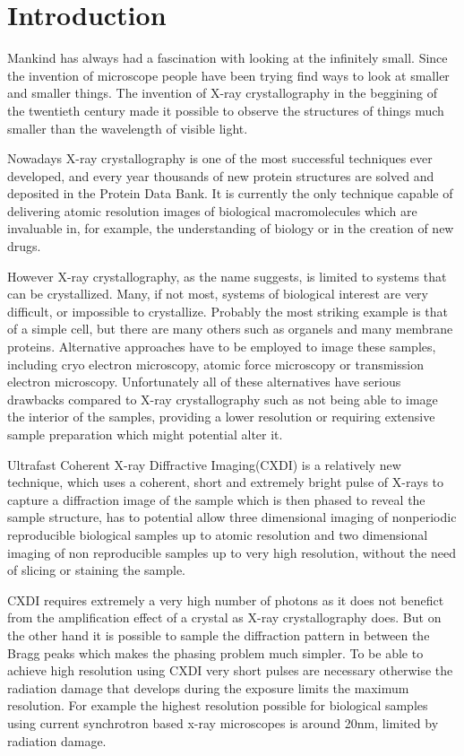 \chapter{Introduction}\label{introduction}\noindent

Mankind has always had a fascination with looking at the infinitely
small. Since the invention of microscope people have been trying find ways to
look at smaller and smaller things. The invention of X-ray crystallography in
the beggining of the twentieth century made it possible to observe the
structures of things much smaller than the wavelength of visible light.

Nowadays X-ray crystallography is one of the most successful techniques ever
developed, and every year thousands of new protein structures are solved and deposited
in the Protein Data Bank. It is currently the only technique capable of
delivering atomic resolution images of biological macromolecules which are
invaluable in, for example, the understanding of biology or in the creation of
new drugs.

However X-ray crystallography, as the name suggests, is limited to systems that
can be crystallized. Many, if not most, systems of biological interest are very
difficult, or impossible to crystallize. Probably the most striking example is
that of a simple cell, but there are many others such as organels and many
membrane proteins. Alternative approaches have to be employed to image these
samples, including cryo electron microscopy, atomic force microscopy or
transmission electron microscopy. Unfortunately all of these alternatives have
serious drawbacks compared to X-ray crystallography such as not being able to
image the interior of the samples, providing a lower resolution or requiring
extensive sample preparation which might potential alter it.

Ultrafast Coherent X-ray Diffractive Imaging(CXDI) is a relatively new
technique, which uses a coherent, short and extremely
bright pulse of X-rays to capture a diffraction image of the sample which is
then phased to reveal the sample structure, has to potential allow three
dimensional imaging of nonperiodic reproducible biological samples up to atomic
resolution and two dimensional imaging of non reproducible samples up to
very high resolution, without the need of slicing or staining the sample.

CXDI requires extremely a very high number of photons as it does not benefict from the
amplification effect of a crystal as X-ray crystallography does. But on the
other hand it is possible to sample the diffraction pattern in between the Bragg
peaks which makes the phasing problem much simpler. To be able to achieve high
resolution using CXDI very short pulses are necessary otherwise the radiation
damage that develops during the exposure limits the maximum resolution. For
example the highest resolution possible for biological samples using current
synchrotron based x-ray microscopes is around 20nm, limited by radiation damage.

